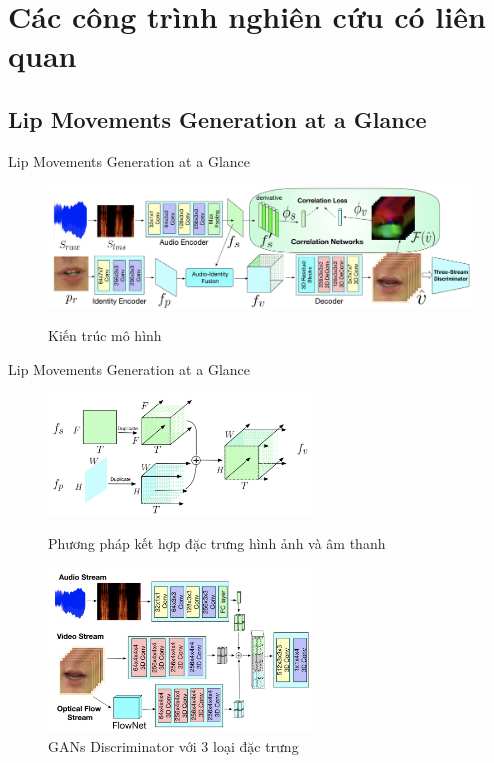 \section{Các công trình nghiên cứu có liên quan}\label{sec:intro}
\frame{\tableofcontents[currentsection]}

\subsection{Lip Movements Generation at a Glance\cite{chen2018}}
\begin{frame}{Lip Movements Generation at a Glance}
    \begin{figure}[H]
    \centering
    \includegraphics[width=12cm]{images/chen2018_model.png}
    \label{fig:chen2018_model}
    \caption{Kiến trúc mô hình}
    \end{figure}
\end{frame}

\begin{frame}{Lip Movements Generation at a Glance}
    \begin{figure}[H]
        \centering
        \begin{minipage}{0.48\textwidth}
            \includegraphics[width=7cm]{./images/chen2018_fusion.png}
            \caption{Phương pháp kết hợp đặc trưng hình ảnh và âm thanh}
            \label{fig:chen2018_fusion}
        \end{minipage}\hfill
        \begin{minipage}{0.48\textwidth}
            \includegraphics[width=7cm]{./images/chen2018_gans.png}
            \caption{GANs Discriminator với 3 loại đặc trưng}
            \label{fig:chen2018_gans}
        \end{minipage}
    \end{figure}
\end{frame}

